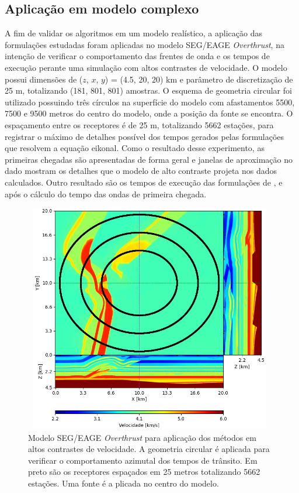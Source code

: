 \subsection*{Aplicação em modelo complexo}

A fim de validar os algoritmos em um modelo realístico, a aplicação das formulações estudadas foram aplicadas no modelo SEG/EAGE \textit{Overthrust}, na intenção de verificar o comportamento das frentes de onda e os tempos de execução perante uma simulação com altos contrastes de velocidade. O modelo possui dimensões de  ($z$, $x$, $y$) = (4.5, 20, 20) km e parâmetro de discretização de 25 m, totalizando (181, 801, 801) amostras. O esquema de geometria circular foi utilizado possuindo três círculos na superfície do modelo com afastamentos 5500, 7500 e 9500 metros do centro do modelo, onde a posição da fonte se encontra. O espaçamento entre os receptores é de 25 m, totalizando 5662 estações, para registrar o máximo de detalhes possível dos tempos gerados pelas formulações que resolvem a equação eikonal. Como o resultado desse experimento, as primeiras chegadas são apresentadas de forma geral e janelas de aproximação no dado mostram os detalhes que o modelo de alto contraste projeta nos dados calculados. Outro resultado são os tempos de execução das formulações de ,  e  após o cálculo do tempo das ondas de primeira chegada. 

\begin{figure}[H]
	\centering
	\includegraphics[width = 11cm, height = 10cm]{Imgs/Metodologia/overthrust.png}
	\caption{Modelo SEG/EAGE \textit{Overthrust} para aplicação dos métodos em altos contrastes de velocidade. A geometria circular é aplicada para verificar o comportamento azimutal dos tempos de trânsito. Em preto são os receptores espaçados em 25 metros totalizando 5662 estações. Uma fonte é a plicada no centro do modelo.}
	\label{fig:overthrust}
\end{figure}

